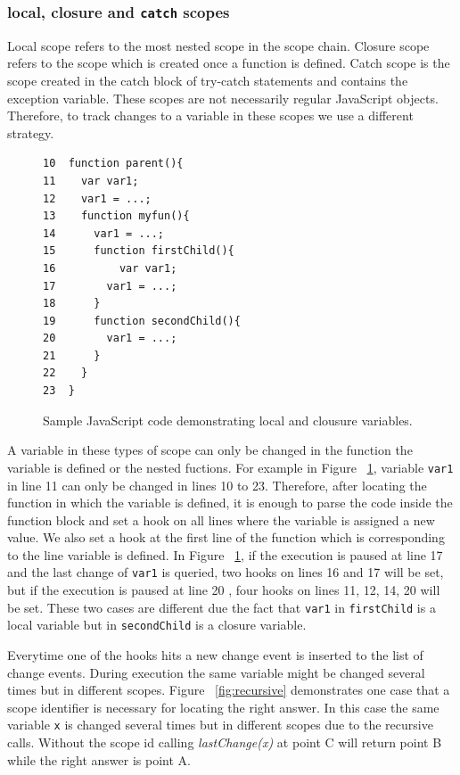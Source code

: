 \documentclass[preprint]{sigplanconf}
\begin{document}
\subsubsection{local, closure and \texttt{catch} scopes}
Local scope refers to the most nested scope in the scope chain. Closure scope refers to the scope which is created once a function is defined. Catch scope is the scope created in the catch block of try-catch statements and contains the exception variable. These scopes are not necessarily regular JavaScript objects. Therefore, to track changes to a variable in these scopes we use a different strategy. 

\begin{figure}[htp]
\begin{verbatim}
10  function parent(){
11    var var1;
12    var1 = ...;
13    function myfun(){
14      var1 = ...;
15      function firstChild(){
16       	var var1;
17        var1 = ...;
18      }  
19      function secondChild(){
20        var1 = ...;			      
21      }
22    }  
23  }    
\end{verbatim}
\caption{Sample JavaScript code demonstrating local and clousure variables.}
\label{fig:js-closure}
\end{figure}

A variable in these types of scope can only be changed in the function the variable is defined or the nested fuctions. For example in Figure ~\ref{fig:js-closure}, variable \texttt{var1} in line 11 can only be changed in lines 10 to 23. Therefore, after locating the function in which the variable is defined, it is enough to parse the code inside the function block and set a hook on all lines where the variable is assigned a new value.%
We also set a hook at the first line of the function which is corresponding to the line variable is defined. In Figure ~\ref{fig:js-closure}, if the execution is paused at line 17 and the last change of \texttt{var1} is queried, two hooks on lines 16 and 17 will be set, but if the execution is paused at line 20 , four hooks on lines 11, 12, 14, 20 will be set. These two cases are different due the fact that \texttt{var1} in \texttt{firstChild} is a local variable but in \texttt{secondChild} is a closure variable.

Everytime one of the hooks hits a new change event is inserted to the list of change events. During execution the same variable might be changed several times but in different scopes. Figure ~\ref{fig:recursive} demonstrates one case that a scope identifier is necessary for locating the right answer. In this case the same variable \texttt{x} is changed several times but in different scopes due to the recursive calls. Without the scope id calling \textit{lastChange(x)} at point C will return point B while the right answer is point A.
\end{document}
